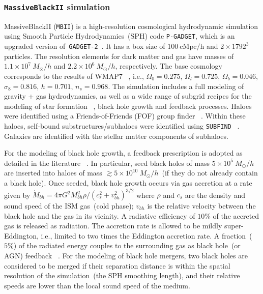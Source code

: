 \documentclass[twocolumn,trackchanges]{aastex63}
\newcommand{\mbii}{\texttt{MBII}}
\begin{document}
\subsubsection{\texttt{MassiveBlackII} simulation}
MassiveBlackII (\mbii) is a high-resolution cosmological hydrodynamic simulation using Smooth Particle Hydrodynamics~(SPH) code \texttt{P-GADGET}, which is an upgraded version of~\texttt{GADGET-2}~\citep{2005MNRAS.364.1105S}. It has a box size of $100~\mathrm{cMpc/h}$ and $2\times1792^3$ particles. The resolution elements for dark matter and gas have masses of $1.1\times 10^7~M_{\odot}/h$ and $2.2\times 10^6~M_{\odot}/h$, respectively. The base cosmology corresponds to the results of WMAP7 ~\citep{2011ApJS..192...18K}, i.e., $\Omega_0=0.275$, $\Omega_l=0.725$, $\Omega_b=0.046$, $\sigma_8=0.816$, $h = 0.701$, $n_s=0.968$.  The simulation includes a full modeling of gravity + gas hydrodynamics, as well as a wide range of subgrid recipes for the modeling of star formation ~\citep{2003MNRAS.339..289S}, black hole growth and feedback processes. Haloes were identified using a Friends-of-Friends (FOF) group finder ~\citep{1985ApJ...292..371D}. Within these haloes, self-bound substructures/subhaloes were identified using \texttt{SUBFIND} ~\citep{2005MNRAS.364.1105S}. Galaxies are identified with the stellar matter components of subhaloes.

For the modeling of black hole growth, a feedback prescription is adopted as detailed in the literature ~\citep{2005Natur.433..604D, 2005MNRAS.361..776S}. In particular, seed black holes of mass $5\times 10^{5}~M_{\odot}/h$ are inserted into haloes of mass $\gtrsim 5\times 10^{10}~M_{\odot}/h$~(if they do not already contain a black hole). Once seeded, black hole growth occurs via gas accretion at a rate given by $\dot{M}_{bh}={4\pi G^2 M_{bh}^2 \rho}/{(c_s^2+v_{bh}^2)^{3/2}}$ where $\rho$ and $c_s$ are the density and sound speed of the ISM gas~(cold phase); $v_{bh}$ is the relative velocity between the black hole and the gas in its vicinity. A radiative efficiency of $10\%$ of the accreted gas is released as radiation. The accretion rate is allowed to be mildly super-Eddington, i.e., limited to two times the Eddington accretion rate. A fraction~($5\%$) of the radiated energy couples to the surrounding gas as black hole~(or AGN) feedback ~\citep{2005Natur.433..604D}. For the modeling of black hole mergers, two black holes are considered to be merged if their separation distance is within the spatial resolution of the simulation~(the SPH smoothing length), and their relative speeds are lower than the local sound speed of the medium.
\end{document}
